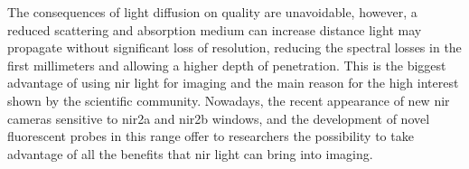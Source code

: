 The consequences of light diffusion on quality are unavoidable, however, a reduced scattering and absorption medium can increase distance light may propagate without significant loss of resolution, reducing the spectral losses in the first millimeters and allowing a higher depth of penetration. This is the biggest advantage of using \gls{nir} light for imaging and the main reason for the high interest shown by the scientific community. Nowadays, the recent appearance of new \gls{nir} cameras sensitive to \gls{nir2}a and \gls{nir2}b windows, and the development of novel fluorescent probes in this range offer to researchers the possibility to take advantage of all the benefits that \gls{nir} light can bring into imaging.
